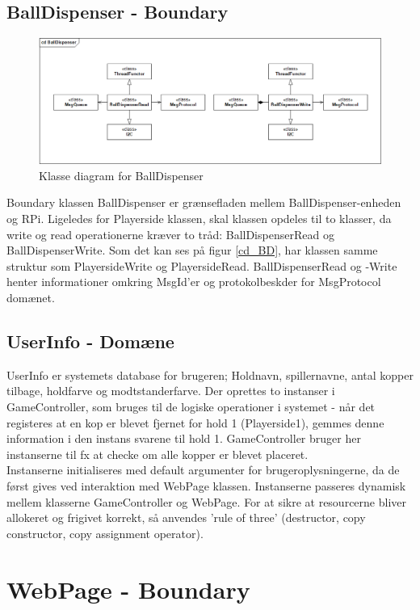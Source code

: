 \documentclass[Softwaredesign/Softwaredesign_main.tex]{subfiles}
\begin{document}
\subsection{BallDispenser - Boundary}
\begin{figure}[H]
    \centering
    \includegraphics[width=1\textwidth]{Softwaredesign/RPiApp/graphic_RPi/BD.png}
    \caption{Klasse diagram for BallDispenser}
   \label{fig:cd_BD}
\end{figure}
Boundary klassen BallDispenser er grænsefladen mellem BallDispenser-enheden og RPi. Ligeledes for Playerside klassen, skal klassen opdeles til to klasser, da write og read operationerne kræver to tråd: BallDispenserRead og BallDispenserWrite. Som det kan ses på figur \ref{cd_BD}, har klassen samme struktur som PlayersideWrite og PlayersideRead. BallDispenserRead og -Write henter informationer omkring MsgId'er og protokolbeskder for MsgProtocol domænet. 

\subsection{UserInfo - Domæne}
UserInfo er systemets database for brugeren; Holdnavn, spillernavne, antal kopper tilbage, holdfarve og modtstanderfarve. Der oprettes to instanser i GameController, som bruges til de logiske operationer i systemet - når det registeres at en kop er blevet fjernet for hold 1 (Playerside1), gemmes denne information i den instans svarene til hold 1. GameController bruger her instanserne til fx at checke om alle kopper er blevet placeret. \\
Instanserne initialiseres med default argumenter for brugeroplysningerne, da de først gives ved interaktion med WebPage klassen. Instanserne passeres dynamisk mellem klasserne GameController og WebPage. For at sikre at resourcerne bliver allokeret og frigivet korrekt, så anvendes 'rule of three' (destructor, copy constructor, copy assignment operator). 

\section{WebPage - Boundary}
\end{document}
